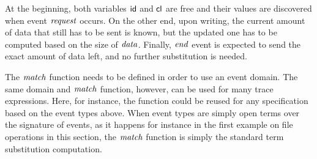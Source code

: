 At the beginning, both variables \(\mathsf{id}\) and \(\mathsf{cl}\) are free and their values are discovered when event \(\mathit{request}\) occurs.
On the other end, upon writing, the current amount of data that still has to be sent is known, but the updated one has to be computed based on the
size of $\mathit{data}$.
Finally, \(\mathit{end}\) event is expected to send the exact amount of data left, and no further substitution is needed.

The \(\mathit{match}\) function needs to be defined in order to use an event domain.
The same domain and \(\mathit{match}\) function, however, can be used for many trace expressions.
Here, for instance, the function could be reused for any specification based on the event types above.
When event types are simply open terms over the signature of events, as it happens for instance in the first example on file operations in this section, the \(\mathit{match}\) function is simply the standard term substitution computation.
